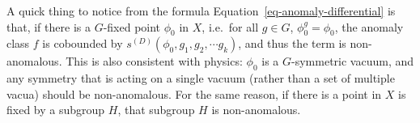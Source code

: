 \documentclass[11pt,toc=bibliography]{scrbook}
\numberwithin{equation}{section}
\begin{document}
\begin{tcolorbox}[enhanced jigsaw, opacityback=0, opacitybacktitle=0.6, leftrule=.75mm, arc=.35mm, coltitle=black, breakable, colframe=quarto-callout-note-color-frame, titlerule=0mm, colback=white, bottomrule=.15mm, left=2mm, colbacktitle=quarto-callout-note-color!10!white, toptitle=1mm, bottomtitle=1mm, title=\textcolor{quarto-callout-note-color}{\faInfo}\hspace{0.5em}{A \(G\)-fixed point indicates anomaly-free.}, rightrule=.15mm, toprule=.15mm]

A quick thing to notice from the formula
Equation~\ref{eq-anomaly-differential} is that, if there is a
\(G\)-fixed point \(\phi_0\) in \(X\), i.e.~for all \(g\in G\),
\(\phi^g_0 = \phi_0\), the anomaly class \(f\) is cobounded by
\(s^{(D)}(\phi_0,g_1,g_2,\cdots g_k)\), and thus the term is
non-anomalous. This is also consistent with physics: \(\phi_0\) is a
\(G\)-symmetric vacuum, and any symmetry that is acting on a single
vacuum (rather than a set of multiple vacua) should be non-anomalous.
For the same reason, if there is a point in \(X\) is fixed by a subgroup
\(H\), that subgroup \(H\) is non-anomalous.

\end{tcolorbox}
\end{document}
